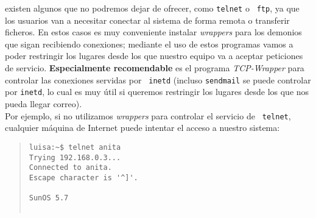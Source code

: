 \begin{itemize}
existen algunos que no podremos dejar de ofrecer, como {\tt telnet} o {\tt
ftp}, ya que los usuarios van a necesitar conectar al sistema de forma remota o
transferir ficheros. En estos casos es muy conveniente instalar {\it wrappers} 
para los demonios que sigan recibiendo conexiones; mediante el uso de estos
programas vamos a poder restringir los lugares desde los que nuestro equipo
va a aceptar peticiones de servicio. {\bf Especialmente recomendable} es el 
programa {\it TCP-Wrapper} para controlar las conexiones servidas por {\tt 
inetd} (incluso {\tt sendmail} se puede controlar por {\tt inetd}, lo cual es 
muy \'util si queremos restringir los lugares desde los que nos pueda llegar 
correo).\\
Por ejemplo, si no utilizamos {\it wrappers} para controlar el servicio de {\tt
telnet}, cualquier m\'aquina de Internet puede intentar el acceso a nuestro
sistema:
\tt
\begin{quote}
\begin{verbatim}
luisa:~$ telnet anita
Trying 192.168.0.3...
Connected to anita.
Escape character is '^]'.

SunOS 5.7


\end{verbatim}
\end{quote}
\end{itemize}
